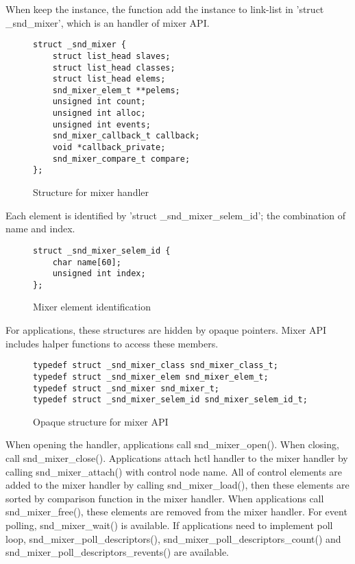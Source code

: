 \documentclass[onecolumn]{article}
\begin{document}
When keep the instance, the function add the instance to link-list in 'struct \_snd\_mixer', which is an handler of mixer API.

\begin{figure}[htbp]
\small
\begin{verbatim}
struct _snd_mixer {
    struct list_head slaves;
    struct list_head classes;
    struct list_head elems;
    snd_mixer_elem_t **pelems;
    unsigned int count;
    unsigned int alloc;
    unsigned int events;
    snd_mixer_callback_t callback;
    void *callback_private;
    snd_mixer_compare_t compare;
};
\end{verbatim}
\caption{{Structure for mixer handler}}
\label{fig:mixer-handler}
\end{figure}

Each element is identified by 'struct \_snd\_mixer\_selem\_id'; the combination of name and index.

\begin{figure}[htbp]
\small
\begin{verbatim}
struct _snd_mixer_selem_id {
    char name[60];
    unsigned int index;
};
\end{verbatim}
\caption{{Mixer element identification}}
\label{fig:mixer-selem-id}
\end{figure}

For applications, these structures are hidden by opaque pointers. Mixer API includes halper functions to access these members.

\begin{figure}[htbp]
\small
\begin{verbatim}
typedef struct _snd_mixer_class snd_mixer_class_t;
typedef struct _snd_mixer_elem snd_mixer_elem_t;
typedef struct _snd_mixer snd_mixer_t;
typedef struct _snd_mixer_selem_id snd_mixer_selem_id_t;
\end{verbatim}
\caption{{Opaque structure for mixer API}}
\label{fig:mixer-opaque-structures}
\end{figure}

When opening the handler, applications call snd\_mixer\_open(). When closing, call snd\_mixer\_close(). Applications attach hctl handler to the mixer handler by calling snd\_mixer\_attach() with control node name. All of control elements are added to the mixer handler by calling snd\_mixer\_load(), then these elements are sorted by comparison function in the mixer handler. When applications call snd\_mixer\_free(), these elements are removed from the mixer handler. For event polling, snd\_mixer\_wait() is available. If applications need to implement poll loop, snd\_mixer\_poll\_descriptors(), snd\_mixer\_poll\_descriptors\_count() and snd\_mixer\_poll\_descriptors\_revents() are available.
\end{document}
